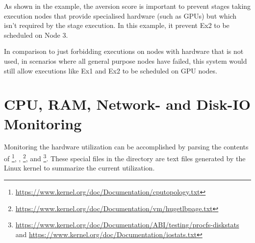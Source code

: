 As shown in the example, the aversion score is important to prevent stages taking execution nodes that provide specialised hardware (such as GPUs) but which isn't required by the stage execution.
In this example, it prevent Ex2 to be scheduled on Node 3.

In comparison to just forbidding executions on nodes with hardware that is not used, in scenarios where all general purpose nodes have failed, this system would still allow executions like Ex1 and Ex2 to be scheduled on GPU nodes.

\section{CPU, RAM, Network- and Disk-IO Monitoring}
\label{design:monitor_resources}


Monitoring the hardware utilization can be accomplished by parsing the contents of \footnote{\url{https://www.kernel.org/doc/Documentation/cputopology.txt}}, , \footnote{\url{https://www.kernel.org/doc/Documentation/vm/hugetlbpage.txt}},  and \linebreak{}\footnote{\url{https://www.kernel.org/doc/Documentation/ABI/testing/procfs-diskstats} and \url{https://www.kernel.org/doc/Documentation/iostats.txt}}.
These special files in the  directory are text files generated by the Linux kernel to summarize the current utilization\cite{linux:doc:proc}.

